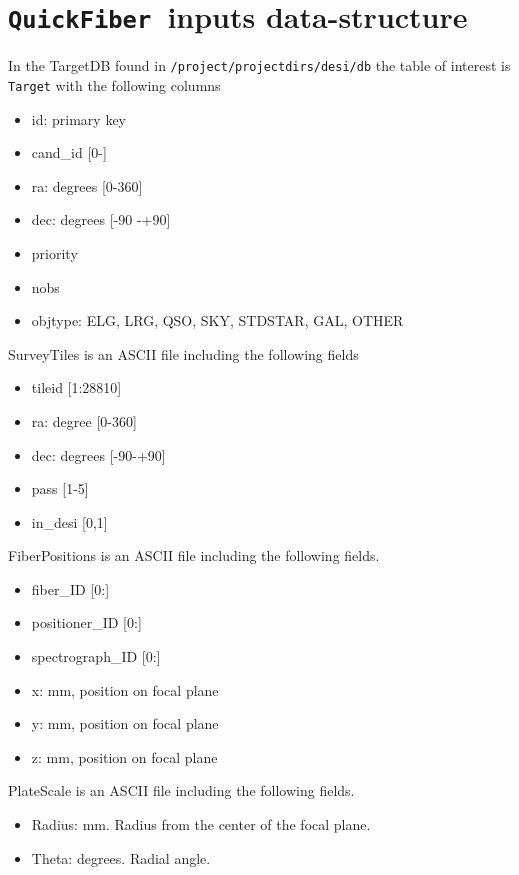 \documentclass{article}
\newcommand{\code}{{\texttt{QuickFiber}}}
\begin{document}
\section{\code\ inputs data-structure}


In the TargetDB found in \texttt{/project/projectdirs/desi/db} the
table of interest is \texttt{Target} with the following columns

\begin{itemize}
\item id: primary key
\item cand\_id [0-]
\item ra: degrees [0-360]
\item dec: degrees [-90 -+90]
\item priority 
\item nobs 
\item objtype: ELG, LRG, QSO, SKY, STDSTAR, GAL, OTHER
\end{itemize}

\noindent
SurveyTiles is an ASCII file including the following fields
\begin{itemize}
\item tileid [1:28810]
\item ra: degree [0-360]
\item dec: degrees [-90-+90]
\item pass [1-5]
\item in\_desi [0,1]
\end{itemize}

\noindent
FiberPositions is an ASCII file including the following fields.
\begin{itemize}
\item fiber\_ID [0:]
\item positioner\_ID  [0:]
\item spectrograph\_ID [0:]
\item x: mm, position on focal plane
\item y: mm, position on focal plane
\item z: mm, position on focal plane
\end{itemize}

\noindent
PlateScale is an ASCII file including the following fields.
\begin{itemize}
\item Radius: mm. Radius from the center of the focal plane.
\item Theta: degrees. Radial angle.
\end{itemize}
\end{document}
